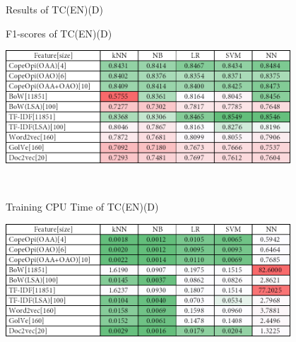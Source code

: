 \caption{Results of TC(EN)(D)}
\label{tab:tc_en_d}
\centering
\begin{subtable}{\textwidth}
	\centering
	\caption{F1-scores of TC(EN)(D)}
	\includegraphics[width=0.8\textwidth]{./figure/01B4.png}
\end{subtable}\\[1em]
\begin{subtable}{\textwidth}
	\centering
	\caption{Training CPU Time of TC(EN)(D)}
	\includegraphics[width=0.8\textwidth]{./figure/01B4t.png}
\end{subtable}
